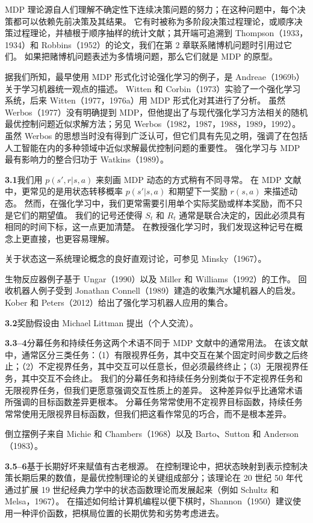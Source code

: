 \documentclass[UTF8,12pt,a4paper,fontset=fandol]{ctexart}
\begin{document}
MDP 理论源自人们理解不确定性下连续决策问题的努力；在这种问题中，每个决策都可以依赖先前决策及其结果。
它有时被称为多阶段决策过程理论，或顺序决策过程理论，并植根于顺序抽样的统计文献；其开端可追溯到 Thompson（1933，1934）和 Robbins（1952）的论文，我们在第 2 章联系赌博机问题时引用过它们。
如果把赌博机问题表述为多情境问题，那么它们就是 MDP 的原型。

据我们所知，最早使用 MDP 形式化讨论强化学习的例子，是 Andreae（1969b）关于学习机器统一观点的描述。
Witten 和 Corbin（1973）实验了一个强化学习系统，后来 Witten（1977，1976a）用 MDP 形式化对其进行了分析。
虽然 Werbos（1977）没有明确提到 MDP，但他提出了与现代强化学习方法相关的随机最优控制问题近似求解方法；另见 Werbos（1982，1987，1988，1989，1992）。
虽然 Werbos 的思想当时没有得到广泛认可，但它们具有先见之明，强调了在包括人工智能在内的多种领域中近似求解最优控制问题的重要性。
强化学习与 MDP 最有影响力的整合归功于 Watkins（1989）。

\noindent\textbf{3.1}\quad 我们用 $p(s',r|s,a)$ 来刻画 MDP 动态的方式稍有不同寻常。
在 MDP 文献中，更常见的是用状态转移概率 $p(s'|s,a)$ 和期望下一奖励 $r(s,a)$ 来描述动态。
然而，在强化学习中，我们更常需要引用单个实际奖励或样本奖励，而不只是它们的期望值。
我们的记号还使得 $S_t$ 和 $R_t$ 通常是联合决定的，因此必须具有相同的时间下标，这一点更加清楚。
在教授强化学习时，我们发现这种记号在概念上更直接，也更容易理解。

关于状态这一系统理论概念的良好直观讨论，可参见 Minsky（1967）。

生物反应器例子基于 Ungar（1990）以及 Miller 和 Williams（1992）的工作。
回收机器人例子受到 Jonathan Connell（1989）建造的收集汽水罐机器人的启发。
Kober 和 Peters（2012）给出了强化学习机器人应用的集合。

\noindent\textbf{3.2}\quad 奖励假设由 Michael Littman 提出（个人交流）。

\noindent\textbf{3.3--4}\quad 分幕任务和持续任务这两个术语不同于 MDP 文献中的通常用法。
在该文献中，通常区分三类任务：（1）有限视界任务，其中交互在某个固定时间步数之后终止；（2）不定视界任务，其中交互可以任意长，但必须最终终止；（3）无限视界任务，其中交互不会终止。
我们的分幕任务和持续任务分别类似于不定视界任务和无限视界任务，但我们更愿意强调交互性质上的差异。
这种差异似乎比通常术语所强调的目标函数差异更根本。
分幕任务常常使用不定视界目标函数，持续任务常常使用无限视界目标函数，但我们把这看作常见的巧合，而不是根本差异。

倒立摆例子来自 Michie 和 Chambers（1968）以及 Barto、Sutton 和 Anderson（1983）。

\noindent\textbf{3.5--6}\quad 基于长期好坏来赋值有古老根源。
在控制理论中，把状态映射到表示控制决策长期后果的数值，是最优控制理论的关键组成部分；该理论在 20 世纪 50 年代通过扩展 19 世纪经典力学中的状态函数理论而发展起来（例如 Schultz 和 Melsa，1967）。
在描述如何给计算机编程以便下棋时，Shannon（1950）建议使用一种评价函数，把棋局位置的长期优势和劣势考虑进去。
\end{document}
